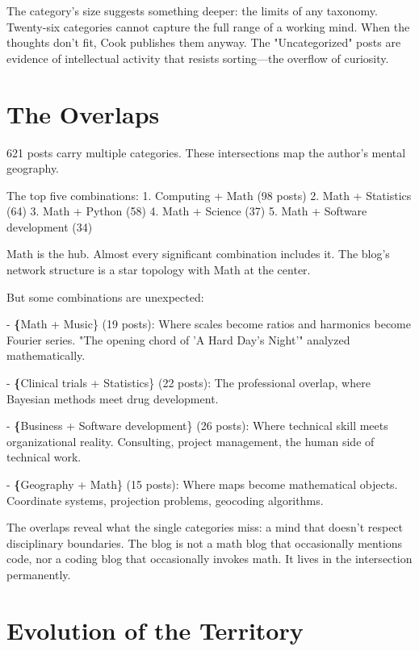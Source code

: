 The category's size suggests something deeper: the limits of any taxonomy. Twenty-six categories cannot capture the full range of a working mind. When the thoughts don't fit, Cook publishes them anyway. The "Uncategorized" posts are evidence of intellectual activity that resists sorting—the overflow of curiosity.

\bigskip

\section*{The Overlaps}

621 posts carry multiple categories. These intersections map the author's mental geography.

The top five combinations:
1. Computing + Math (98 posts)
2. Math + Statistics (64)
3. Math + Python (58)
4. Math + Science (37)
5. Math + Software development (34)

Math is the hub. Almost every significant combination includes it. The blog's network structure is a star topology with Math at the center.

But some combinations are unexpected:

- \textbf\{Math + Music\} (19 posts): Where scales become ratios and harmonics become Fourier series. "The opening chord of 'A Hard Day's Night'" analyzed mathematically.

- \textbf\{Clinical trials + Statistics\} (22 posts): The professional overlap, where Bayesian methods meet drug development.

- \textbf\{Business + Software development\} (26 posts): Where technical skill meets organizational reality. Consulting, project management, the human side of technical work.

- \textbf\{Geography + Math\} (15 posts): Where maps become mathematical objects. Coordinate systems, projection problems, geocoding algorithms.

The overlaps reveal what the single categories miss: a mind that doesn't respect disciplinary boundaries. The blog is not a math blog that occasionally mentions code, nor a coding blog that occasionally invokes math. It lives in the intersection permanently.

\bigskip

\section*{Evolution of the Territory}

